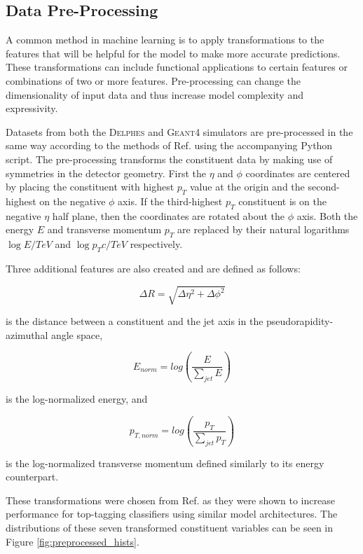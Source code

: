 \subsection{Data Pre-Processing}
A common method in machine learning is to apply transformations to the features that will be helpful for the model to make more accurate predictions. These transformations can include functional applications to certain features or combinations of two or more features. Pre-processing can change the dimensionality of input data and thus increase model complexity and expressivity.

Datasets from both the \textsc{Delphes} and \textsc{Geant4} simulators are pre-processed in the same way according to the methods of Ref. \cite{ATL-PHYS-PUB-2022-039} using the accompanying Python script. The pre-processing transforms the constituent data by making use of symmetries in the detector geometry. First the $\eta$ and $\phi$ coordinates are centered by placing the constituent with highest $p_T$ value at the origin and the second-highest on the negative $\phi$ axis. If the third-highest $p_T$ constituent is on the negative $\eta$ half plane, then the coordinates are rotated about the $\phi$ axis. Both the energy $E$ and transverse momentum $p_T$ are replaced by their natural logarithms $\log E/\si{TeV}$ and $\log p_T c/\si{TeV}$ respectively.

Three additional features are also created and are defined as follows:

\begin{equation}
    \Delta R = \sqrt{\Delta\eta^2 + \Delta\phi^2}
\end{equation}

is the distance between a constituent and the jet axis in the pseudorapidity-azimuthal angle space,

\begin{equation}
    E_{norm} = log \left( \frac{E}{\sum\limits_{jet} E} \right)
\end{equation}

is the log-normalized energy, and

\begin{equation}
    p_{T,norm} = log \left( \frac{p_T}{\sum\limits_{jet} p_T} \right)
\end{equation}

is the log-normalized transverse momentum defined similarly to its energy counterpart.

These transformations were chosen from Ref. \cite{ATL-PHYS-PUB-2022-039} as they were shown to increase performance for top-tagging classifiers using similar model architectures. The distributions of these seven transformed constituent variables can be seen in Figure \ref{fig:preprocessed_hists}.

